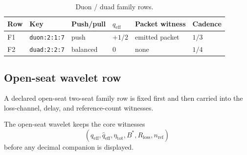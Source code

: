 \begin{table}[H]
\centering
\caption{Duon / duad family rows.}
\label{tab:manual-duon-duad-family}
\begin{threeparttable}
\small
\begin{tabular}{@{}llllll@{}}
\toprule
Row & Key & Push/pull & $q_{\mathrm{eff}}$ & Packet witness & Cadence \\
\midrule
F1 & \texttt{duon:2:1:7} & push & $+1/2$ & emitted packet & $1/3$ \\
F2 & \texttt{duad:2:2:7} & balanced & $0$ & none & $1/4$ \\
\bottomrule
\end{tabular}
\end{threeparttable}
\end{table}

\subsection{Open-seat wavelet row}
\label{man:open-seat-wavelet-row}
A declared open-seat two-seat family row is fixed first and then carried into the loss-channel, delay, and reference-count witnesses.\par\smallskip
{}

The open-seat wavelet keeps the core witnesses
\[
(q_{\mathrm{eff}},\widehat q_{\mathrm{eff}},\eta_{\mathrm{tot}},B^*,R_{\mathrm{loss}},n_{\mathrm{ref}})
\]
before any decimal companion is displayed.


